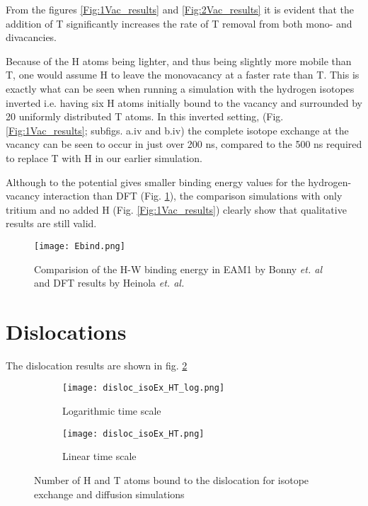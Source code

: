 From the figures \ref{Fig:1Vac_results} and \ref{Fig:2Vac_results} it is evident that the addition of T significantly increases the rate of T removal from both mono- and divacancies. 

Because of the H atoms being lighter, and thus being slightly more mobile than T, one would assume H to leave the monovacancy at a faster rate than T. This is exactly what can be seen when running a simulation with the hydrogen isotopes inverted i.e. having six H atoms initially bound to the vacancy and surrounded by 20 uniformly distributed T atoms. In this inverted setting, (Fig. \ref{Fig:1Vac_results}; subfigs. a.iv and b.iv) the complete isotope exchange at the vacancy can be seen to occur in just over 200 ns, compared to the 500 ns required to replace T with H in our earlier simulation.  

Although to the potential gives smaller binding energy values for the hydrogen-vacancy interaction than DFT (Fig. \ref{Fig:Ebind1H_DFT}), the comparison simulations with only tritium and no added H (Fig. \ref{Fig:1Vac_results}) clearly show that qualitative results are still valid.

\begin{figure}[!ht]
\center
\texttt{[image: Ebind.png]}
\caption{Comparision of the H-W binding energy in EAM1 by Bonny \textit{et. al} and DFT results by Heinola \textit{et. al. }\cite{heinolaTungstenDFT}}
\label{Fig:Ebind1H_DFT}
\end{figure}




\section{Dislocations}
The dislocation results are shown in fig. \ref{Fig:disloc_results}

\begin{figure}[ht]
\begin{subfigure}{.5\textwidth}
  \centering
 \texttt{[image: disloc\_isoEx\_HT\_log.png]}  
  \caption{Logarithmic time scale}
\end{subfigure}
\begin{subfigure}{.5\textwidth}
  \centering
  \texttt{[image: disloc\_isoEx\_HT.png]}  
  \caption{Linear time scale}
\end{subfigure}
   \caption{Number of H and T atoms bound to the dislocation for isotope exchange and diffusion simulations}
   \label{Fig:disloc_results} 
\end{figure}



